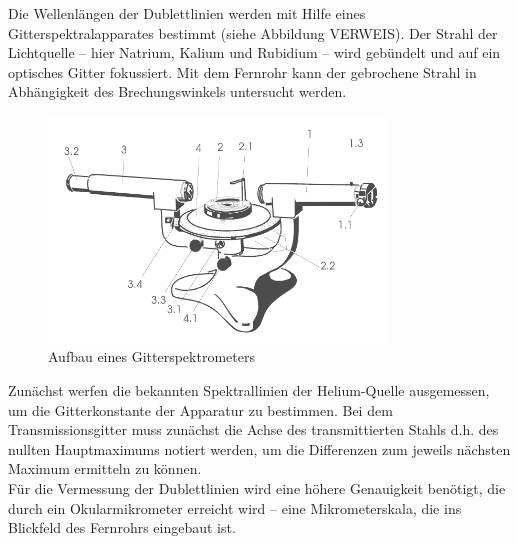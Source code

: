 Die Wellenlängen der Dublettlinien werden mit Hilfe eines Gitterspektralapparates bestimmt (siehe Abbildung VERWEIS). Der Strahl der Lichtquelle -- hier Natrium, Kalium und Rubidium -- wird gebündelt und auf ein optisches Gitter fokussiert. Mit dem Fernrohr kann der gebrochene Strahl in Abhängigkeit des Brechungswinkels untersucht werden. \\
\begin{figure}[h!]
	\centering
	\includegraphics[width=0.8\textwidth]{Spektrometer.png}
	\caption{Aufbau eines Gitterspektrometers}
\end{figure}
Zunächst werfen die bekannten Spektrallinien der Helium-Quelle ausgemessen, um die Gitterkonstante der Apparatur zu bestimmen. Bei dem Transmissionsgitter muss zunächst die Achse des transmittierten Stahls d.h. des nullten Hauptmaximums notiert werden, um die Differenzen zum jeweils nächsten Maximum ermitteln zu können. \\
Für die Vermessung der Dublettlinien wird  eine höhere Genauigkeit benötigt, die durch ein Okularmikrometer erreicht wird -- eine Mikrometerskala, die ins Blickfeld des Fernrohrs eingebaut ist.

